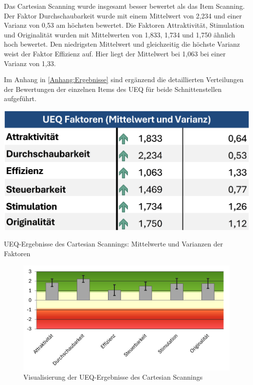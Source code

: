 Das Cartesian Scanning wurde insgesamt besser bewertet als das Item Scanning. Der Faktor Durchschaubarkeit wurde mit einem Mittelwert von 2,234 und einer Varianz von 0,53 am höchsten bewertet. Die Faktoren Attraktivität, Stimulation und Originalität wurden mit Mittelwerten von 1,833, 1,734 und 1,750 ähnlich hoch bewertet. Den niedrigsten Mittelwert und gleichzeitig die höchste Varianz weist der Faktor Effizienz auf. Hier liegt der Mittelwert bei 1,063 bei einer Varianz von 1,33. 

Im Anhang in \autoref{Anhang:Ergebnisse} sind ergänzend die detaillierten Verteilungen der Bewertungen der einzelnen Items des UEQ für beide Schnittenstellen aufgeführt. 

\begin{table}[tbh]
    \centering
    \includegraphics{images/Results/UEQ-Table-Means-Cartesian.png}
    \caption{UEQ-Ergebnisse des Cartesian Scannings: Mittelwerte und Varianzen der Faktoren}
    \label{tab:ueqScalesCartesian}
\end{table}

\begin{figure}[tbh]
    \centering
    \includegraphics{images/Results/UEQ-Cartesian.png}
    \caption{Visualisierung der UEQ-Ergebnisse des Cartesian Scannings}
    \label{fig:ueqScoreCartesian}
\end{figure}



